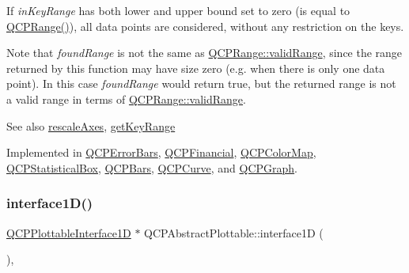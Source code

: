 If {\itshape in\+Key\+Range} has both lower and upper bound set to zero (is equal to {\ttfamily \mbox{\hyperlink{class_q_c_p_range}{Q\+C\+P\+Range()}}}), all data points are considered, without any restriction on the keys.

Note that {\itshape found\+Range} is not the same as \mbox{\hyperlink{class_q_c_p_range_ab38bd4841c77c7bb86c9eea0f142dcc0}{Q\+C\+P\+Range\+::valid\+Range}}, since the range returned by this function may have size zero (e.\+g. when there is only one data point). In this case {\itshape found\+Range} would return true, but the returned range is not a valid range in terms of \mbox{\hyperlink{class_q_c_p_range_ab38bd4841c77c7bb86c9eea0f142dcc0}{Q\+C\+P\+Range\+::valid\+Range}}.

\begin{DoxySeeAlso}{See also}
\mbox{\hyperlink{class_q_c_p_abstract_plottable_a1491c4a606bccd2d09e65e11b79eb882}{rescale\+Axes}}, \mbox{\hyperlink{class_q_c_p_abstract_plottable_a4da16d3cd4b509e1104a9b0275623c96}{get\+Key\+Range}} 
\end{DoxySeeAlso}


Implemented in \mbox{\hyperlink{class_q_c_p_error_bars_ab76215a186ae4862235821e028685f26}{Q\+C\+P\+Error\+Bars}}, \mbox{\hyperlink{class_q_c_p_financial_a82d862aa134d78853f98f8c57a03415b}{Q\+C\+P\+Financial}}, \mbox{\hyperlink{class_q_c_p_color_map_a88134493aaf6b297af34eaab65264fff}{Q\+C\+P\+Color\+Map}}, \mbox{\hyperlink{class_q_c_p_statistical_box_ab3388a21d0c2e86fbc0cba9c06ceb49b}{Q\+C\+P\+Statistical\+Box}}, \mbox{\hyperlink{class_q_c_p_bars_a02cee4bf94d48a1e5f6fc185d9a10477}{Q\+C\+P\+Bars}}, \mbox{\hyperlink{class_q_c_p_curve_a8bb8e3b9085f15921dc40483fb025ab2}{Q\+C\+P\+Curve}}, and \mbox{\hyperlink{class_q_c_p_graph_a8f773e56f191a61c06e129e90a604d77}{Q\+C\+P\+Graph}}.

\mbox{\label{class_q_c_p_abstract_plottable_a81fd9fd5c4f429c074785e2eb238a8e7}} 
\subsubsection{\texorpdfstring{interface1\+D()}{interface1D()}}
{\footnotesize\ttfamily \mbox{\hyperlink{class_q_c_p_plottable_interface1_d}{Q\+C\+P\+Plottable\+Interface1D}} $\ast$ Q\+C\+P\+Abstract\+Plottable\+::interface1D (\begin{DoxyParamCaption}{ }\end{DoxyParamCaption})\hspace{0.3cm}{\ttfamily [inline]}, {\ttfamily [virtual]}}

